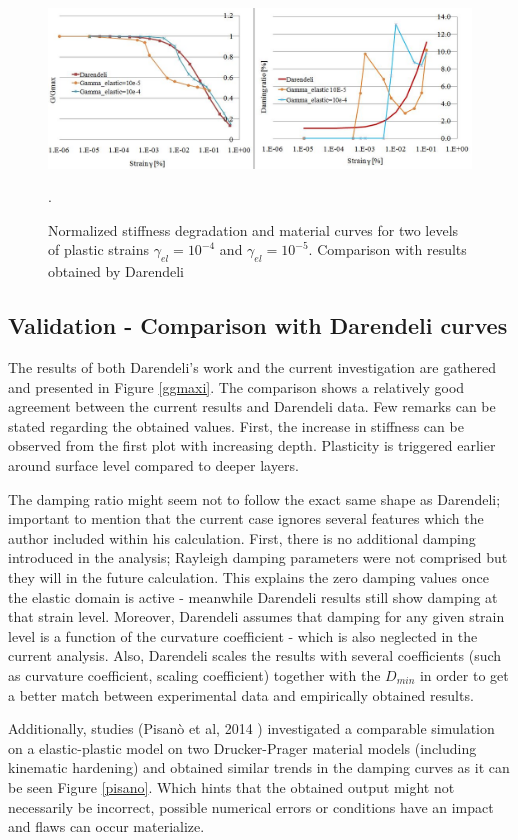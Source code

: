 \documentclass[11pt,a4paper]{report}
\begin{document}
\begin{figure}[h!]
	\centering
	\includegraphics[width=1\linewidth]{"ggmax2"}
	\caption{Normalized stiffness degradation and material curves for two levels of plastic strains $\gamma_{el}=10^{-4}$ and $\gamma_{el}=10^{-5}$. Comparison with results obtained by Darendeli}
	\label{ggmax}.
\end{figure}

\subsection{Validation - Comparison with Darendeli curves}
The results of both Darendeli's work and the current investigation are gathered and presented in Figure \ref{ggmaxi}. The comparison shows a relatively good agreement between the current results and Darendeli data. Few remarks can be stated regarding the obtained values. First, the increase in stiffness can be observed from the first plot with increasing depth. Plasticity is triggered earlier around surface level compared to deeper layers. 

The damping ratio might seem not to follow the exact same shape as Darendeli; important to mention that the current case ignores several features which the author included within his calculation. First, there is no additional damping introduced in the analysis; Rayleigh damping parameters were not comprised but they will in the future calculation. This explains the zero damping values once the elastic domain is active - meanwhile Darendeli results still show damping at that strain level. Moreover, Darendeli assumes that damping for any given strain level is a function of the curvature coefficient - which is also neglected in the current analysis. Also, Darendeli scales the results with several coefficients (such as curvature coefficient, scaling coefficient) together with the $D_{min}$ in order to get a better match between experimental data and empirically obtained results. 

Additionally, studies (Pisan\`{o} et al, 2014 \cite{papadrakakiscomparison}) investigated a comparable simulation on a elastic-plastic model on two Drucker-Prager material models (including kinematic hardening) and obtained similar trends in the damping curves as it can be seen Figure \ref{pisano}. Which hints that the obtained output might not necessarily be incorrect, possible numerical errors or conditions have an impact and flaws can occur materialize. 
\end{document}
